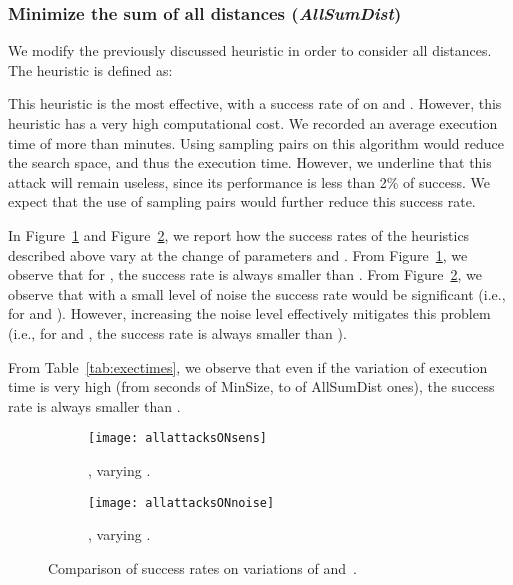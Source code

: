 \documentclass[conference]{IEEEtran}
\newcommand{\hilight}[1]{#1}
\begin{document}
\subsubsection{Minimize the sum of all distances (\textit{AllSumDist})}
We modify the previously discussed heuristic in order to consider all distances.
The heuristic is defined as:

This heuristic is the most effective, with a success rate of  on  and .
However, this heuristic has a very high computational cost.
We recorded an average execution time of more than  minutes. \hilight{Using sampling pairs on this algorithm would reduce the search space, and thus the execution time.
However, we underline that this attack will remain useless, since its performance is less than 2\% of success.
We expect that the use of sampling pairs would further reduce this success rate.}



In Figure~\ref{fig:allattacksONsens} and Figure~\ref{fig:allattacksONnoise}, we report how the success rates of the heuristics described above vary at the change of parameters  and . From Figure~\ref{fig:allattacksONsens}, we observe that for , the success rate is always smaller than .
From Figure~\ref{fig:allattacksONnoise}, we observe that with a small level of noise the success rate would be significant (i.e.,  for  and ).
However, increasing the noise level effectively mitigates this problem (i.e., for  and , the success rate is always smaller than ).

From Table~\ref{tab:exectimes}, we observe that even if the variation of execution time is very high (from  seconds of MinSize, to  of AllSumDist ones), the success rate is always smaller than .

\begin{figure}[ht]
\centering
\begin{subfigure}{.48\textwidth}
\centering
\texttt{[image: allattacksONsens]}
  \caption{,  varying .} \label{fig:allattacksONsens}
\end{subfigure}
\begin{subfigure}{.48\textwidth}
\centering
\texttt{[image: allattacksONnoise]}
 \caption{, varying .} \label{fig:allattacksONnoise}
\end{subfigure}
\caption{Comparison of success rates on variations of  and~.}
\label{fig:allattacksONnoiseANDsens}
\end{figure}
\end{document}
